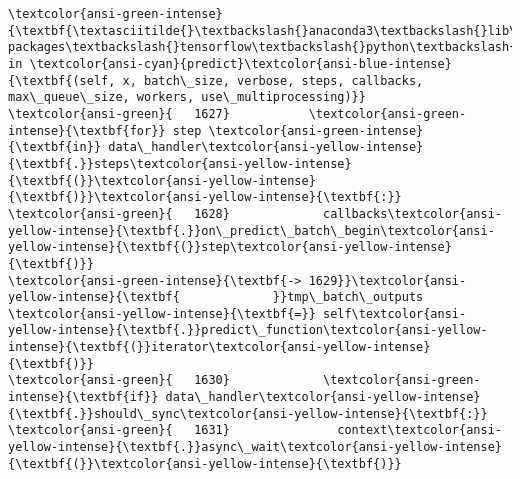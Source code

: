 \documentclass[11pt]{article}
\begin{document}
\begin{Verbatim}[commandchars=\\\{\}, frame=single, framerule=2mm, rulecolor=\color{outerrorbackground}]
\textcolor{ansi-green-intense}{\textbf{\textasciitilde{}\textbackslash{}anaconda3\textbackslash{}lib\textbackslash{}site-packages\textbackslash{}tensorflow\textbackslash{}python\textbackslash{}keras\textbackslash{}engine\textbackslash{}training.py}} in \textcolor{ansi-cyan}{predict}\textcolor{ansi-blue-intense}{\textbf{(self, x, batch\_size, verbose, steps, callbacks, max\_queue\_size, workers, use\_multiprocessing)}}
\textcolor{ansi-green}{   1627}           \textcolor{ansi-green-intense}{\textbf{for}} step \textcolor{ansi-green-intense}{\textbf{in}} data\_handler\textcolor{ansi-yellow-intense}{\textbf{.}}steps\textcolor{ansi-yellow-intense}{\textbf{(}}\textcolor{ansi-yellow-intense}{\textbf{)}}\textcolor{ansi-yellow-intense}{\textbf{:}}
\textcolor{ansi-green}{   1628}             callbacks\textcolor{ansi-yellow-intense}{\textbf{.}}on\_predict\_batch\_begin\textcolor{ansi-yellow-intense}{\textbf{(}}step\textcolor{ansi-yellow-intense}{\textbf{)}}
\textcolor{ansi-green-intense}{\textbf{-> 1629}}\textcolor{ansi-yellow-intense}{\textbf{             }}tmp\_batch\_outputs \textcolor{ansi-yellow-intense}{\textbf{=}} self\textcolor{ansi-yellow-intense}{\textbf{.}}predict\_function\textcolor{ansi-yellow-intense}{\textbf{(}}iterator\textcolor{ansi-yellow-intense}{\textbf{)}}
\textcolor{ansi-green}{   1630}             \textcolor{ansi-green-intense}{\textbf{if}} data\_handler\textcolor{ansi-yellow-intense}{\textbf{.}}should\_sync\textcolor{ansi-yellow-intense}{\textbf{:}}
\textcolor{ansi-green}{   1631}               context\textcolor{ansi-yellow-intense}{\textbf{.}}async\_wait\textcolor{ansi-yellow-intense}{\textbf{(}}\textcolor{ansi-yellow-intense}{\textbf{)}}


\end{Verbatim}
\end{document}
